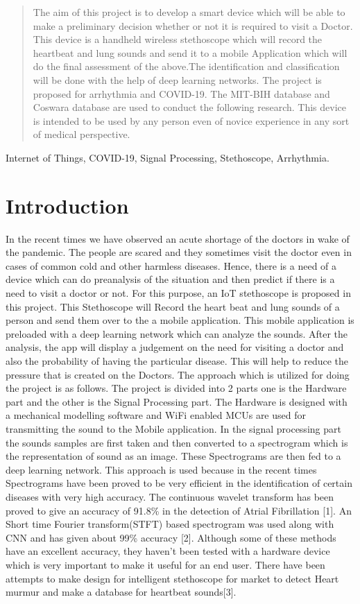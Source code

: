\documentclass[conference]{IEEEtran}
\begin{document}
\begin{abstract}
The aim of this project is to develop a smart device which will be able to make a preliminary decision whether or not it is required to visit a Doctor. This device is a handheld wireless stethoscope which will record the heartbeat and lung sounds and send it to a mobile Application which will do the final assessment of the above.The identification and classification will be done with the help of deep learning networks. The project is proposed for arrhythmia and COVID-19. The MIT-BIH database and Coswara database are used to conduct the following research. This device is intended to be used by any person even of novice experience in any sort of medical perspective. 
\end{abstract}

\begin{IEEEkeywords}
Internet of Things, COVID-19, Signal Processing, Stethoscope, Arrhythmia.
\end{IEEEkeywords}

\section{Introduction}
In the recent times we have observed an acute shortage of the doctors in wake of the pandemic. The people are scared and they sometimes visit the doctor even in cases of common cold and other harmless diseases. Hence, there is a need of a device which can do preanalysis of the situation and then predict if there is a need to visit a doctor or not. For this purpose, an IoT stethoscope is proposed in this project. This Stethoscope will Record the heart beat and lung sounds of a person and send them over to the a mobile application. This mobile application is preloaded with a deep learning network which can analyze the sounds. After the analysis, the app will display a judgement on the need for visiting a doctor and also the probability of having the particular disease. This will help to reduce the pressure that is created on the Doctors. The approach which is utilized for doing the project is as follows. The project is divided into 2 parts one is the Hardware part and the other is the Signal Processing part. The Hardware is designed with a mechanical modelling software and WiFi enabled MCUs are used for transmitting the sound to the Mobile application. In the signal processing part the sounds samples are first taken and then converted to a spectrogram which is the representation of sound as an image. These Spectrograms are then fed to a deep learning network. This approach is used because in the recent times Spectrograms have been proved to be very efficient in the identification of certain diseases with very high accuracy. The  continuous wavelet transform has been proved to give an accuracy of 91.8\% in the detection of Atrial Fibrillation [1]. An Short time Fourier transform(STFT) based spectrogram was used along with CNN and has given about 99\% accuracy [2]. Although some of these methods have an excellent accuracy, they haven't been tested with a hardware device which is very important to make it useful for an end user. There have been attempts to make design for intelligent stethoscope for market to detect Heart murmur and make a database for heartbeat sounds[3].
 
\end{document}
